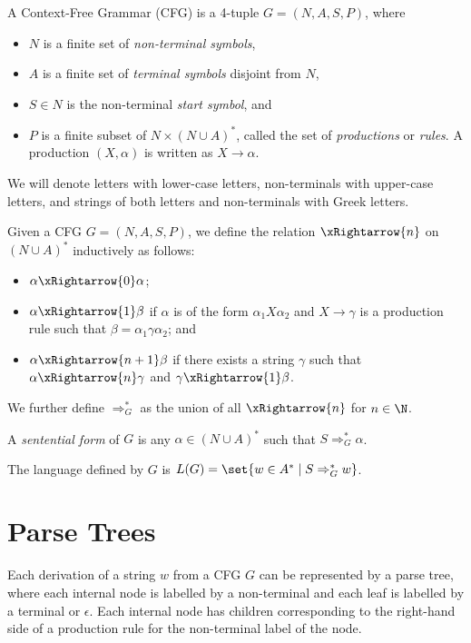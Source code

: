 \begin{definition} \label{def:cfg}
    A Context-Free Grammar (CFG) is a 4-tuple $G = (N, A, S, P)$, where
    \begin{itemize}
        \item $N$ is a finite set of \emph{non-terminal symbols},
        \item $A$ is a finite set of \emph{terminal symbols}
        disjoint from $N$,
        \item $S \in N$ is the non-terminal \emph{start symbol}, and
        \item $P$ is a finite subset of $N \times (N \cup A)^*$,
        called the set of \emph{productions} or \emph{rules}.
        A production $(X, \alpha)$ is written as $X \to \alpha$.
    \end{itemize}
\end{definition}
We will denote letters with lower-case letters, non-terminals with
upper-case letters, and strings of both letters and non-terminals with
Greek letters.
\begin{definition}
    Given a CFG $G = (N, A, S, P)$, we define the relation $\xRightarrow{n}$
    on $(N \cup A)^*$ inductively as follows:
    \begin{itemize}
        \item $\alpha \xRightarrow{0} \alpha$;
        \item $\alpha \xRightarrow{1} \beta$ if $\alpha$ is of the form
        $\alpha_1 X \alpha_2$ and $X \to \gamma$ is a production rule such
        that $\beta = \alpha_1 \gamma \alpha_2$; and
        \item $\alpha \xRightarrow{n+1} \beta$ if there exists a string
        $\gamma$ such that $\alpha \xRightarrow{n} \gamma$ and
        $\gamma \xRightarrow{1} \beta$.
    \end{itemize}
    We further define $\Rightarrow^*_G$ as the union of all
    $\xRightarrow{n}$ for $n \in \N$.

    A \emph{sentential form} of $G$ is any $\alpha \in (N \cup A)^*$ such
    that $S \Rightarrow^*_G \alpha$.

    The language defined by $G$ is
    $L(G) = \set{w \in A^* \mid S \Rightarrow^*_G w}$.
\end{definition}

\section{Parse Trees} \label{sec:cfg:parse_trees}
Each derivation of a string $w$ from a CFG $G$ can be represented by a
parse tree, where each internal node is labelled by a non-terminal and
each leaf is labelled by a terminal or $\epsilon$.
Each internal node has children corresponding to the right-hand side of
a production rule for the non-terminal label of the node.

